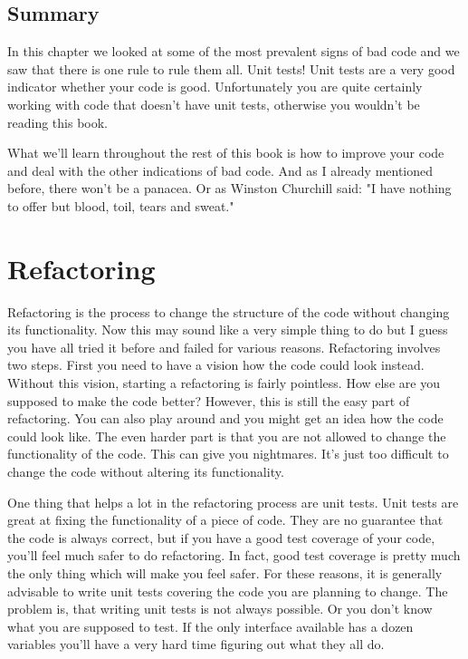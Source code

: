 \section{Summary}

In this chapter we looked at some of the most prevalent signs of bad code and we saw that there is one rule to rule them all. Unit tests! Unit tests are a very good indicator whether your code is good. Unfortunately you are quite certainly working with code that doesn't have unit tests, otherwise you wouldn't be reading this book.

What we'll learn throughout the rest of this book is how to improve your code and deal with the other indications of bad code. And as I already mentioned before, there won't be a panacea. Or as Winston Churchill said: "I have nothing to offer but blood, toil, tears and sweat."

\chapter{Refactoring}

Refactoring is the process to change the structure of the code without changing its functionality. Now this may sound like a very simple thing to do but I guess you have all tried it before and failed for various reasons. Refactoring involves two steps. First you need to have a vision how the code could look instead. Without this vision, starting a refactoring is fairly pointless. How else are you supposed to make the code better? However, this is still the easy part of refactoring. You can also play around and you might get an idea how the code could look like. The even harder part is that you are not allowed to change the functionality of the code. This can give you nightmares. It's just too difficult to change the code without altering its functionality.

One thing that helps a lot in the refactoring process are unit tests. Unit tests are great at fixing the functionality of a piece of code. They are no guarantee that the code is always correct, but if you have a good test coverage of your code, you'll feel much safer to do refactoring. In fact, good test coverage is pretty much the only thing which will make you feel safer. For these reasons, it is generally advisable to write unit tests covering the code you are planning to change. The problem is, that writing unit tests is not always possible. Or you don't know what you are supposed to test. If the only interface available has a dozen variables you'll have a very hard time figuring out what they all do.


